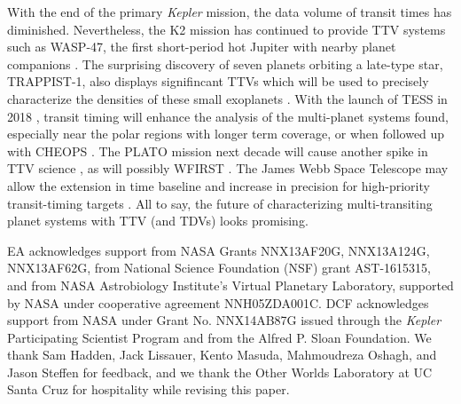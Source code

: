 \documentclass[graybox,natbib,nosecnum]{svmult}
\begin{document}
With the end of the primary \emph{Kepler} mission, the data volume of transit times has diminished.
Nevertheless, the K2 mission has continued to provide TTV systems such as WASP-47, the first
short-period hot Jupiter with nearby planet companions \citep{2015Becker}.  The surprising discovery
of seven planets orbiting a late-type star, TRAPPIST-1, also displays signifincant TTVs which
will be used to precisely characterize the densities of these small exoplanets \citep{2017Natur.542..456G}.
With the launch of TESS in 2018 \citep{2015JATIS...1a4003R}, transit timing will enhance the analysis 
of the multi-planet systems found, especially near the polar regions with longer term coverage, 
or when followed up with CHEOPS \citep{2014PASP..126.1134B}. 
The PLATO mission next decade will cause another spike in TTV science \citep{2014ExA....38..249R},
as will possibly WFIRST \citep{2017PASP..129d4401M}. The James Webb Space Telescope may allow the
extension in time baseline and increase in precision for high-priority transit-timing targets 
\citep{2014PASP..126.1134B}.  All to say, the future of characterizing multi-transiting planet
systems with TTV (and TDVs) looks promising.


\begin{acknowledgement}
EA acknowledges support from NASA Grants NNX13AF20G, NNX13A124G, NNX13AF62G, from National Science Foundation (NSF) grant AST-1615315, and from NASA Astrobiology Institute's Virtual Planetary Laboratory, supported by NASA under cooperative agreement NNH05ZDA001C.  DCF acknowledges support from NASA under Grant No. NNX14AB87G issued through the \emph{Kepler} Participating Scientist Program and from the Alfred P. Sloan Foundation.  We thank Sam Hadden, Jack Lissauer, Kento Masuda, Mahmoudreza Oshagh, and Jason Steffen for feedback, and we thank the Other Worlds Laboratory at UC Santa Cruz for hospitality while revising this paper.
\end{acknowledgement}

\end{document}
